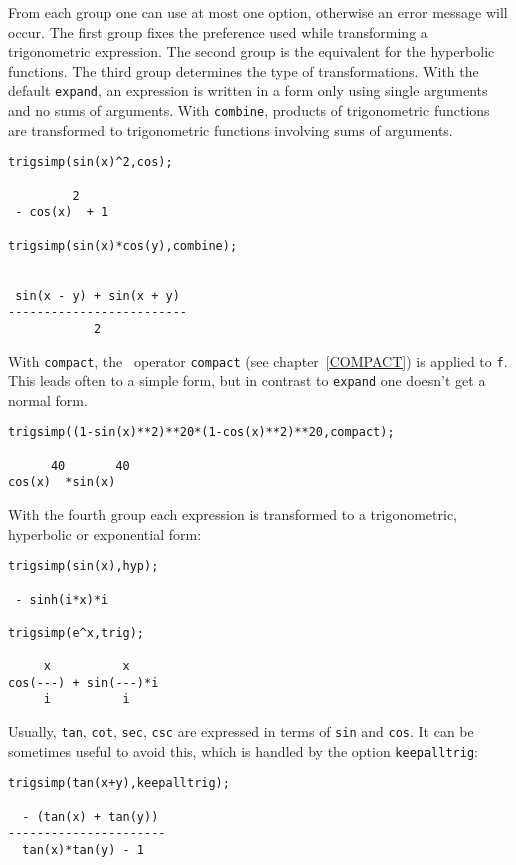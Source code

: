 From each group one can use at most one option, otherwise an error 
message will occur. The first group fixes the preference used while 
transforming a trigonometric expression.
The second group is the equivalent for the hyperbolic functions. 
The third group determines the type of transformations. With 
the default {\tt expand}, an expression is written in a form only using 
single arguments and no sums of arguments.  With {\tt combine},
products of trigonometric functions are transformed to trigonometric
functions involving sums of arguments.


\begin{verbatim}
trigsimp(sin(x)^2,cos);

         2
 - cos(x)  + 1

trigsimp(sin(x)*cos(y),combine);

        
 sin(x - y) + sin(x + y)
-------------------------
            2
\end{verbatim}

With {\tt compact}, the \REDUCE\ operator {\tt compact} (see
chapter~\ref{COMPACT}) is applied to {\tt f}. 
This leads often to a simple form, but in contrast to {\tt expand} one 
doesn't get a normal form.

\begin{verbatim}
trigsimp((1-sin(x)**2)**20*(1-cos(x)**2)**20,compact);

      40       40
cos(x)  *sin(x)
\end{verbatim}

With the fourth group each expression is transformed to a
trigonometric, hyperbolic or exponential form:

\begin{verbatim}
trigsimp(sin(x),hyp);

 - sinh(i*x)*i

trigsimp(e^x,trig);

     x          x
cos(---) + sin(---)*i
     i          i
\end{verbatim}


Usually, {\tt tan}, {\tt cot}, {\tt sec}, {\tt csc} are expressed in terms of
{\tt sin} and {\tt cos}.  It can 
be sometimes useful to avoid this, which is handled by the option 
{\tt keepalltrig}:

\begin{verbatim}
trigsimp(tan(x+y),keepalltrig);

  - (tan(x) + tan(y))
----------------------
  tan(x)*tan(y) - 1
\end{verbatim}


